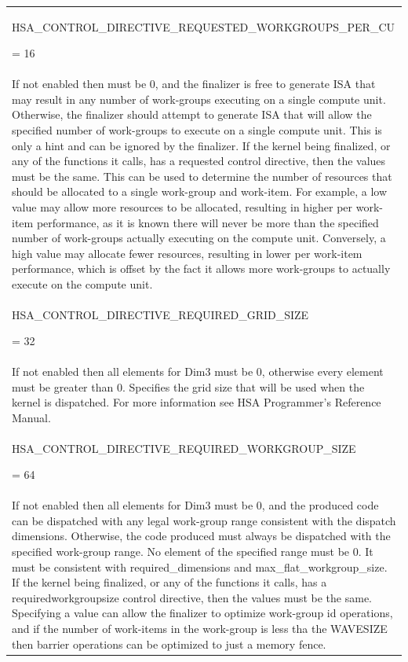 \documentclass[final]{book}
\newcommand{\reftyp}[1]{#1}
\newcommand{\refenu}[1]{\reftyp{#1}}
\begin{document}
\begin{appendices}
\begin{longtable}{@{\hspace{2em}}p{\linewidth-2em}}
\hspace{-2em}\hypertarget{group--FinalizerCoreApi-1ggac86e8f3e8ccba532765320c93b18ac95a7484fcb226f9a32131d1441804729de8}{\refenu{HSA_CONTROL_DIRECTIVE_REQUESTED_WORKGROUPS_PER_CU}} = 16\\If not enabled then must be 0, and the finalizer is free to generate ISA that may result in any number of work-groups executing on a single compute unit. Otherwise, the finalizer should attempt to generate ISA that will allow the specified number of work-groups to execute on a single compute unit. This is only a hint and can be ignored by the finalizer. If the kernel being finalized, or any of the functions it calls, has a requested control directive, then the values must be the same. This can be used to determine the number of resources that should be allocated to a single work-group and work-item. For example, a low value may allow more resources to be allocated, resulting in higher per work-item performance, as it is known there will never be more than the specified number of work-groups actually executing on the compute unit. Conversely, a high value may allocate fewer resources, resulting in lower per work-item performance, which is offset by the fact it allows more work-groups to actually execute on the compute unit.\\[2mm]
\hspace{-2em}\hypertarget{group--FinalizerCoreApi-1ggac86e8f3e8ccba532765320c93b18ac95aec0ed09e5dff4aaa7d10a4c04164aad2}{\refenu{HSA_CONTROL_DIRECTIVE_REQUIRED_GRID_SIZE}} = 32\\If not enabled then all elements for Dim3 must be 0, otherwise every element must be greater than 0. Specifies the grid size that will be used when the kernel is dispatched. For more information see HSA Programmer's Reference Manual.\\[2mm]
\hspace{-2em}\hypertarget{group--FinalizerCoreApi-1ggac86e8f3e8ccba532765320c93b18ac95af517ba5e36ed04fc558871509b8c47a7}{\refenu{HSA_CONTROL_DIRECTIVE_REQUIRED_WORKGROUP_SIZE}} = 64\\If not enabled then all elements for Dim3 must be 0, and the produced code can be dispatched with any legal work-group range consistent with the dispatch dimensions. Otherwise, the code produced must always be dispatched with the specified work-group range. No element of the specified range must be 0. It must be consistent with required_dimensions and max_flat_workgroup_size. If the kernel being finalized, or any of the functions it calls, has a requiredworkgroupsize control directive, then the values must be the same. Specifying a value can allow the finalizer to optimize work-group id operations, and if the number of work-items in the work-group is less tha the WAVESIZE then barrier operations can be optimized to just a memory fence.\\[2mm]

\end{longtable}
\end{appendices}
\end{document}
